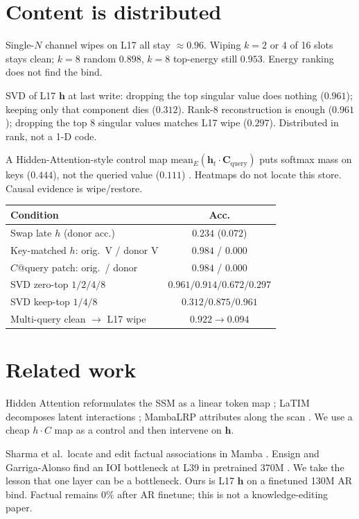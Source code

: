 \documentclass[11pt]{article}
\begin{document}
\section{Content is distributed}

Single-$N$ channel wipes on L17 all stay $\approx 0.96$.
Wiping $k=2$ or $4$ of 16 slots stays clean; $k=8$ random $0.898$,
$k=8$ top-energy still $0.953$.
Energy ranking does not find the bind.

SVD of L17 $\mathbf{h}$ at last write: dropping the top singular value
does nothing ($0.961$); keeping only that component dies ($0.312$).
Rank-8 reconstruction is enough ($0.961$); dropping the top 8 singular
values matches L17 wipe ($0.297$).
Distributed in rank, not a 1-D code.

A Hidden-Attention-style control map
$\mathrm{mean}_E(\mathbf{h}_t \cdot \mathbf{C}_{\mathrm{query}})$ puts
softmax mass on keys ($0.444$), not the queried value ($0.111$)
\cite{ali2025,pitorro2025}.
Heatmaps do not locate this store.
Causal evidence is wipe/restore.

\begin{center}
\small
\begin{tabular}{@{}lc@{}}
\toprule
Condition & Acc. \\
\midrule
Swap late $h$ (donor acc.) & $0.234$ ($0.072$) \\
Key-matched $h$: orig.\ V / donor V & $0.984$ / $0.000$ \\
$C$@query patch: orig.\ / donor & $0.984$ / $0.000$ \\
SVD zero-top $1/2/4/8$ & $0.961/0.914/0.672/0.297$ \\
SVD keep-top $1/4/8$ & $0.312/0.875/0.961$ \\
Multi-query clean $\to$ L17 wipe & $0.922 \to 0.094$ \\
\bottomrule
\end{tabular}
\end{center}

\section{Related work}

Hidden Attention reformulates the SSM as a linear token map
\cite{ali2025}; LaTIM decomposes latent interactions \cite{pitorro2025};
MambaLRP attributes along the scan \cite{jafari2024}.
We use a cheap $h \cdot C$ map as a control and then intervene on
$\mathbf{h}$.

Sharma et al.\ locate and edit factual associations in Mamba
\cite{sharma2024}.
Ensign and Garriga-Alonso find an IOI bottleneck at L39 in pretrained
370M \cite{ensign2024}.
We take the lesson that one layer can be a bottleneck.
Ours is L17 $\mathbf{h}$ on a finetuned 130M AR bind.
Factual remains $0\%$ after AR finetune; this is not a knowledge-editing
paper.
\end{document}
